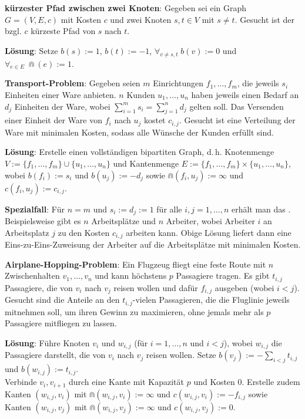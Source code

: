 \textbf{kürzester Pfad zwischen zwei Knoten}:
Gegeben sei ein Graph $G = (V, E, c)$ mit Kosten $c$ und
zwei Knoten $s, t \in V$ mit $s \not= t$.
Gesucht ist der bzgl. $c$ kürzeste Pfad von $s$ nach $t$.

\textbf{Lösung}:
Setze $b(s) := 1$, $b(t) := -1$, $\forall_{v \not= s, t}\; b(v) := 0$ und
$\forall_{e \in E}\; \Cap(e) := 1$.

\linie

\textbf{Transport-Problem}:
Gegeben seien $m$ Einrichtungen $f_1, \dotsc, f_m$, die jeweils $s_i$ Einheiten einer Ware
anbieten.
$n$ Kunden $u_1, \dotsc, u_n$ haben jeweils einen Bedarf an $d_j$ Einheiten der Ware,
wobei $\sum_{i=1}^m s_i = \sum_{j=1}^n d_j$ gelten soll.
Das Versenden einer Einheit der Ware von $f_i$ nach $u_j$ kostet $c_{i,j}$.
Gesucht ist eine Verteilung der Ware mit minimalen Kosten, sodass alle Wünsche der Kunden
erfüllt sind.

\textbf{Lösung}:
Erstelle einen vollständigen bipartiten Graph, d.\,h. Knotenmenge\\
$V := \{f_1, \dotsc, f_m\} \cup \{u_1, \dotsc, u_n\}$
und Kantenmenge $E := \{f_1, \dotsc, f_m\} \times \{u_1, \dotsc, u_n\}$,\\
wobei $b(f_i) := s_i$ und $b(u_j) := -d_j$ sowie
$\Cap(f_i, u_j) := \infty$ und $c(f_i, u_j) := c_{i,j}$.

\textbf{Spezialfall}:
Für $n = m$ und $s_i := d_j := 1$ für alle $i, j = 1, \dotsc, n$ erhält man das
.
Beispielsweise gibt es $n$ Arbeitsplätze und $n$ Arbeiter,
wobei Arbeiter $i$ an Arbeitsplatz $j$ zu den Kosten $c_{i,j}$ arbeiten kann.
Obige Lösung liefert dann eine Eins-zu-Eins-Zuweisung der Arbeiter auf die Arbeitsplätze
mit minimalen Kosten.

\linie

\textbf{Airplane-Hopping-Problem}:
Ein Flugzeug fliegt eine feste Route mit $n$ Zwischenhalten $v_1, \dotsc, v_n$
und kann höchstens $p$ Passagiere tragen.
Es gibt $t_{i,j}$ Passagiere, die von $v_i$ nach $v_j$ reisen wollen
und dafür $f_{i,j}$ ausgeben (wobei $i < j$).
Gesucht sind die Anteile an den $t_{i,j}$-vielen Passagieren, die die Fluglinie jeweils mitnehmen
soll, um ihren Gewinn zu maximieren, ohne jemals mehr als $p$ Passagiere mitfliegen zu lassen.

\textbf{Lösung}:
Führe Knoten $v_i$ und $w_{i,j}$ (für $i = 1, \dotsc, n$ und $i < j$),
wobei $w_{i,j}$ die Passagiere darstellt, die von $v_i$ nach $v_j$ reisen wollen.
Setze $b(v_j) :=-\sum_{i<j} t_{i,j}$ und $b(w_{i,j}) := t_{i,j}$.\\
Verbinde $v_i, v_{i+1}$ durch eine Kante mit Kapazität $p$ und Kosten $0$.
Erstelle zudem\\
Kanten $(w_{i,j}, v_i)$ mit $\Cap(w_{i,j}, v_i) := \infty$ und
$c(w_{i,j}, v_i) := -f_{i,j}$ sowie\\
Kanten $(w_{i,j}, v_j)$ mit $\Cap(w_{i,j}, v_j) := \infty$ und $c(w_{i,j}, v_j) := 0$.

\pagebreak
